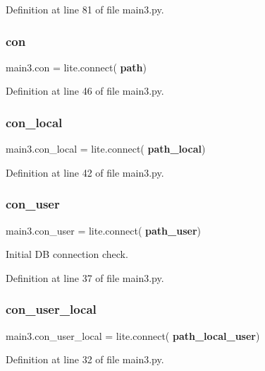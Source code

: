 Definition at line 81 of file main3.\+py.

\mbox{\label{namespacemain3_a4a9ab88fdf3f5bfc0803104c30ddfc98}} 
\subsubsection{con}
{\footnotesize\ttfamily main3.\+con = lite.\+connect(\textbf{ path})}



Definition at line 46 of file main3.\+py.

\mbox{\label{namespacemain3_ac151e893e4ce2a34734073cf06c5f84a}} 
\subsubsection{con\+\_\+local}
{\footnotesize\ttfamily main3.\+con\+\_\+local = lite.\+connect(\textbf{ path\+\_\+local})}



Definition at line 42 of file main3.\+py.

\mbox{\label{namespacemain3_a53e03f12882bc3b99c9324b7814074ec}} 
\subsubsection{con\+\_\+user}
{\footnotesize\ttfamily main3.\+con\+\_\+user = lite.\+connect(\textbf{ path\+\_\+user})}



Initial DB connection check. 



Definition at line 37 of file main3.\+py.

\mbox{\label{namespacemain3_a693b4f7c34d4957bdd692bbb2ec9775f}} 
\subsubsection{con\+\_\+user\+\_\+local}
{\footnotesize\ttfamily main3.\+con\+\_\+user\+\_\+local = lite.\+connect(\textbf{ path\+\_\+local\+\_\+user})}



Definition at line 32 of file main3.\+py.


